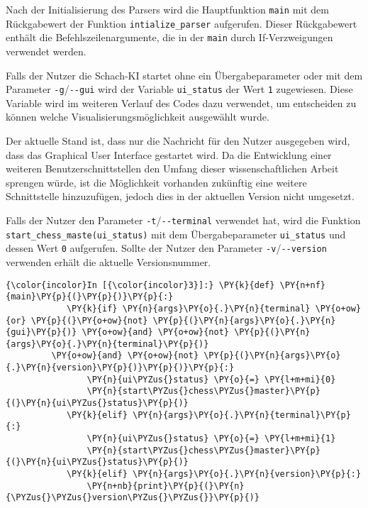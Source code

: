     Nach der Initialisierung des Parsers wird die Hauptfunktion
\texttt{main} mit dem Rückgabewert der Funktion
\texttt{intialize\_parser} aufgerufen. Dieser Rückgabewert enthält die
Befehlszeilenargumente, die in der \texttt{main} durch If-Verzweigungen
verwendet werden.

Falls der Nutzer die Schach-KI startet ohne ein Übergabeparameter oder
mit dem Parameter \texttt{-g}/\texttt{-\/-gui} wird der Variable
\texttt{ui\_status} der Wert \texttt{1} zugewiesen. Diese Variable wird
im weiteren Verlauf des Codes dazu verwendet, um entscheiden zu können
welche Visualisierungsmöglichkeit ausgewählt wurde.

Der aktuelle Stand ist, dass nur die Nachricht für den Nutzer ausgegeben
wird, dass das Graphical User Interface gestartet wird. Da die
Entwicklung einer weiteren Benutzerschnittstellen den Umfang dieser
wissenschaftlichen Arbeit sprengen würde, ist die Möglichkeit vorhanden
zukünftig eine weitere Schnittstelle hinzuzufügen, jedoch dies in der
aktuellen Version nicht umgesetzt.

Falls der Nutzer den Parameter \texttt{-t}/\texttt{-\/-terminal}
verwendet hat, wird die Funktion
\texttt{start\_chess\_maste(ui\_status)} mit dem Übergabeparameter
\texttt{ui\_status} und dessen Wert \texttt{0} aufgerufen. Sollte der
Nutzer den Parameter \texttt{-v}/\texttt{-\/-version} verwenden erhält
die aktuelle Versionsnummer.

    \begin{Verbatim}[commandchars=\\\{\}]
{\color{incolor}In [{\color{incolor}3}]:} \PY{k}{def} \PY{n+nf}{main}\PY{p}{(}\PY{p}{)}\PY{p}{:}
            \PY{k}{if} \PY{n}{args}\PY{o}{.}\PY{n}{terminal} \PY{o+ow}{or} \PY{p}{(}\PY{o+ow}{not} \PY{p}{(}\PY{n}{args}\PY{o}{.}\PY{n}{gui}\PY{p}{)} \PY{o+ow}{and} \PY{o+ow}{not} \PY{p}{(}\PY{n}{args}\PY{o}{.}\PY{n}{terminal}\PY{p}{)} 
	     \PY{o+ow}{and} \PY{o+ow}{not} \PY{p}{(}\PY{n}{args}\PY{o}{.}\PY{n}{version}\PY{p}{)}\PY{p}{)}\PY{p}{:}
                \PY{n}{ui\PYZus{}status} \PY{o}{=} \PY{l+m+mi}{0}
                \PY{n}{start\PYZus{}chess\PYZus{}master}\PY{p}{(}\PY{n}{ui\PYZus{}status}\PY{p}{)}
            \PY{k}{elif} \PY{n}{args}\PY{o}{.}\PY{n}{terminal}\PY{p}{:}
                \PY{n}{ui\PYZus{}status} \PY{o}{=} \PY{l+m+mi}{1}
                \PY{n}{start\PYZus{}chess\PYZus{}master}\PY{p}{(}\PY{n}{ui\PYZus{}status}\PY{p}{)}
            \PY{k}{elif} \PY{n}{args}\PY{o}{.}\PY{n}{version}\PY{p}{:}
                \PY{n+nb}{print}\PY{p}{(}\PY{n}{\PYZus{}\PYZus{}version\PYZus{}\PYZus{}}\PY{p}{)}
\end{Verbatim}

